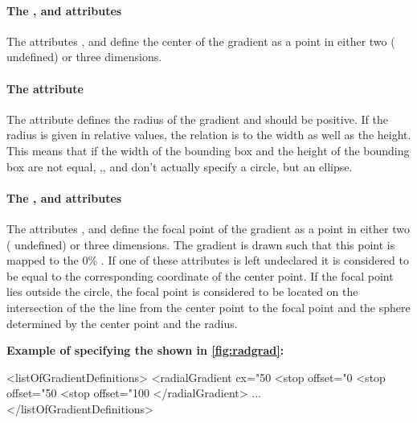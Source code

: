 \paragraph{The \fixttspace{}, \fixttspace{} and \fixttspace{} attributes}

The attributes ,  and  define the center of the gradient as a point in either two ( undefined) or three dimensions.


\paragraph{The \fixttspace{} attribute}

The attribute  defines the radius of the gradient and should be positive. If the radius is given in relative values, the relation is to the width as well as the height. This means that 
if the width of the bounding box and the height of the bounding box are not equal, ,,
and  don't actually specify a circle, but an ellipse.

\paragraph{The \fixttspace{}, \fixttspace{} and \fixttspace{} attributes}

The attributes ,  and  define the focal point of the gradient as a point in either two ( undefined) or three dimensions. The gradient is drawn such that this point is mapped to the 0\% \GradientStop. If one of these attributes is left undeclared it is considered to be equal to the corresponding coordinate of the center point. If the focal point lies outside 
the circle, the focal point is considered to be located on the intersection of the the line from the center
point to the focal point and the sphere determined by the center point and the radius.


  {\bf
Example of specifying the \RadialGradient shown in \ref{fig:radgrad}:
}

{\footnotesize
\begin{example}
<listOfGradientDefinitions>
  <radialGradient cx="50%
    <stop offset="0%
    <stop offset="50%
    <stop offset="100%
  </radialGradient>
       ...
</listOfGradientDefinitions>
\end{example}
}

